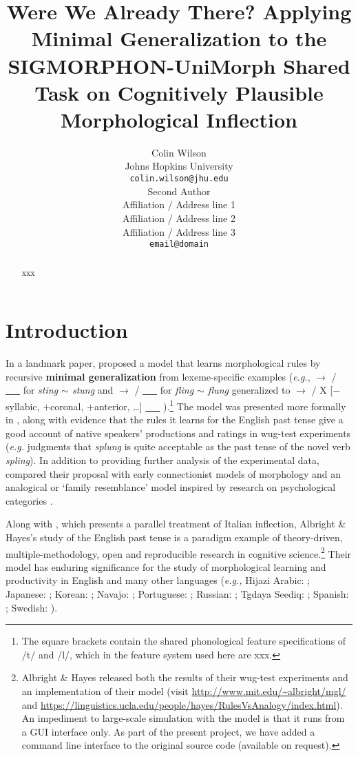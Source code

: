 \documentclass[11pt]{article}
\title{Were We Already There? Applying Minimal Generalization to the SIGMORPHON-UniMorph Shared Task on Cognitively Plausible Morphological Inflection}
\author{Colin Wilson\\
  Johns Hopkins University \\
  \texttt{colin.wilson@jhu.edu} \\\And
  Second Author \\
  Affiliation / Address line 1 \\
  Affiliation / Address line 2 \\
  Affiliation / Address line 3 \\
  \texttt{email@domain} \\}
\begin{document}
\maketitle
\begin{abstract}
xxx
\end{abstract}

\section{Introduction}

In a landmark paper, \citet{albright2003} proposed a model that learns morphological rules by recursive \textbf{minimal generalization} from lexeme-specific examples (\emph{e.g.},  $\to$  /  \underline{\ \ \ }  for \emph{sting $\sim$ stung} and  $\to$  /  \underline{\ \ \ }  for \emph{fling $\sim$ flung} generalized to   $\to$  / X [$-$syllabic, $+$coronal, $+$anterior, \ldots] \underline{\ \ \ } ).\footnote{The square brackets contain the shared phonological feature specifications of /t/ and /l/, which in the feature system used here are xxx.} The model was presented more formally in \citet{albright2002a}, along with evidence that the rules it learns for the English past tense give a good account of native speakers' productions and ratings in wug-test experiments (\emph{e.g.} judgments that \textit{splung} is quite acceptable as the past tense of the novel verb \textit{spling}). In addition to providing further analysis of the experimental data, \citet{albright2003} compared their proposal with early connectionist models of morphology \citep[\emph{e.g.,}][]{plunkett1999} and an analogical or `family resemblance' model inspired by research on psychological categories \citep{nakisa2001}.

Along with \citet{albright2002b}, which presents a parallel treatment of Italian inflection, Albright \& Hayes's study of the English past tense is a paradigm example of theory-driven, multiple-methodology, open and reproducible research in cognitive science.\footnote{Albright \& Hayes released both the results of their wug-test experiments and an implementation of their model (visit \url{http://www.mit.edu/~albright/mgl/} and \url{https://linguistics.ucla.edu/people/hayes/RulesVsAnalogy/index.html}). An impediment to large-scale simulation with the model is that it runs from a GUI interface only. As part of the present project, we have added a command line interface to the original source code (available on request).} Their model has enduring significance for the study of morphological learning and productivity in English \citep[\emph{e.g.,}][]{racz-etal-2014-rules, racz2020a, corkery-etal-2019-yet} and many other languages (\emph{e.g.,} Hijazi Arabic: \citealt{ahyad2019}; Japanese: \citealt{oseki-etal-2019-inverting}; Korean: \citealt{albright2009}; Navajo: \citealt{albright2006}; Portuguese: \citealt{verissimo2014}; Russian: \citealt{kapatsinski2010a}; Tgdaya Seediq: \citealt{kuo2020}; Spanish: \citealt{albright2003}; Swedish: \citealt{strik2014}).
\end{document}
